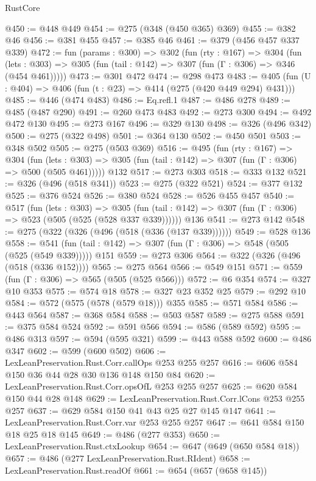 \begin{lexlean}{RustCore}
\begin{coremodule}
@450 := @448 @449
@454 := @275 (@348 (@450 @365) @369)
@455 := @382 @46
@456 := @381 @455
@457 := @385 @46
@461 := @379 (@456 @457 @337 @339)
@472 := fun (params : @300) =>
  @302
    (fun (rty : @167) =>
    @304
      (fun (lets : @303) => @305 (fun (tail : @142) => @307 (fun (Γ : @306) => @346 (@454 @461)))))
@473 := @301 @472
@474 := @298 @473
@483 := @405 (fun (U : @404) => @406 (fun (t : @23) => @414 (@275 (@420 @449 @294) @431)))
@485 := @446 (@474 @483)
@486 := Eq.refl.{1}
@487 := @486 @278
@489 := @485 (@487 @290)
@491 := @260 @473 @483
@492 := @273 @300
@494 := @492 @472 @130
@495 := @273 @167
@496 := @329 @130
@498 := @326 (@496 @342)
@500 := @275 (@322 @498)
@501 := @364 @130
@502 := @450 @501
@503 := @348 @502
@505 := @275 (@503 @369)
@516 := @495
    (fun (rty : @167) =>
    @304
      (fun (lets : @303) => @305 (fun (tail : @142) => @307 (fun (Γ : @306) => @500 (@505 @461)))))
    @132
@517 := @273 @303
@518 := @333 @132
@521 := @326 (@496 (@518 @341))
@523 := @275 (@322 @521)
@524 := @377 @132
@525 := @376 @524
@526 := @380 @524
@528 := @526 @455 @457
@540 := @517
    (fun (lets : @303) =>
    @305 (fun (tail : @142) => @307 (fun (Γ : @306) => @523 (@505 (@525 (@528 @337 @339))))))
    @136
@541 := @273 @142
@548 := @275 (@322 (@326 (@496 (@518 (@336 (@137 @339))))))
@549 := @528 @136
@558 := @541 (fun (tail : @142) => @307 (fun (Γ : @306) => @548 (@505 (@525 (@549 @339))))) @151
@559 := @273 @306
@564 := @322 (@326 (@496 (@518 (@336 @152))))
@565 := @275 @564
@566 := @549 @151
@571 := @559 (fun (Γ : @306) => @565 (@505 (@525 @566)))
@572 := @6 @354
@574 := @327 @10 @353
@575 := @574 @18
@578 := @327 @23 @352 @25
@579 := @292 @10
@584 := @572 (@575 (@578 (@579 @18))) @355
@585 := @571 @584
@586 := @443 @564
@587 := @368 @584
@588 := @503 @587
@589 := @275 @588
@591 := @375 @584 @524
@592 := @591 @566
@594 := @586 (@589 @592)
@595 := @486 @313
@597 := @594 (@595 @321)
@599 := @443 @588 @592
@600 := @486 @347
@602 := @599 (@600 @502)
@606 := LexLeanPreservation.Rust.Corr.callOps @253 @255 @257
@616 := @606 @584 @150 @36 @44 @28 @30 @136 @148 @150 @84
@620 := LexLeanPreservation.Rust.Corr.opsOfL @253 @255 @257
@625 := @620 @584 @150 @44 @28 @148
@629 := LexLeanPreservation.Rust.Corr.lCons @253 @255 @257
@637 := @629 @584 @150 @41 @43 @25 @27 @145 @147
@641 := LexLeanPreservation.Rust.Corr.var @253 @255 @257
@647 := @641 @584 @150 @18 @25 @18 @145
@649 := @486 (@277 @353)
@650 := LexLeanPreservation.Rust.ctxLookup
@654 := @647 (@649 (@650 @584 @18))
@657 := @486 (@277 LexLeanPreservation.Rust.RIdent)
@658 := LexLeanPreservation.Rust.readOf
@661 := @654 (@657 (@658 @145))

\end{coremodule}
\end{lexlean}
